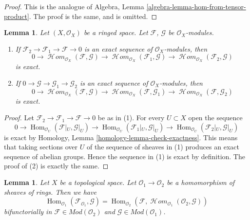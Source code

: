 \documentclass{stacks-project}
\theoremstyle{plain}
\newtheorem{lemma}[subsection]{Lemma}
\theoremstyle{definition}
\theoremstyle{remark}
\numberwithin{equation}{subsection}
\def\Hom{\mathop{\mathrm{Hom}}\nolimits}
\def\SheafHom{\mathop{\mathcal{H}\!\mathit{om}}\nolimits}
\begin{document}
\begin{proof}
This is the analogue of
Algebra, Lemma \ref{algebra-lemma-hom-from-tensor-product}.
The proof is the same, and is omitted.
\end{proof}

\begin{lemma}
\label{lemma-internal-hom-exact}
Let $(X, \mathcal{O}_X)$ be a ringed space.
Let $\mathcal{F}$, $\mathcal{G}$ be $\mathcal{O}_X$-modules.
\begin{enumerate}
\item If $\mathcal{F}_2 \to \mathcal{F}_1 \to \mathcal{F} \to 0$
is an exact sequence of $\mathcal{O}_X$-modules, then
$$
0 \to
\SheafHom_{\mathcal{O}_X}(\mathcal{F}, \mathcal{G}) \to
\SheafHom_{\mathcal{O}_X}(\mathcal{F}_1, \mathcal{G}) \to
\SheafHom_{\mathcal{O}_X}(\mathcal{F}_2, \mathcal{G})
$$
is exact.
\item If $0 \to \mathcal{G} \to \mathcal{G}_1 \to \mathcal{G}_2$
is an exact sequence of $\mathcal{O}_X$-modules, then
$$
0 \to
\SheafHom_{\mathcal{O}_X}(\mathcal{F}, \mathcal{G}) \to
\SheafHom_{\mathcal{O}_X}(\mathcal{F}, \mathcal{G}_1) \to
\SheafHom_{\mathcal{O}_X}(\mathcal{F}, \mathcal{G}_2)
$$
is exact.
\end{enumerate}
\end{lemma}

\begin{proof}
Let $\mathcal{F}_2 \to \mathcal{F}_1 \to \mathcal{F} \to 0$
be as in (1). For every $U \subset X$ open the sequence
$$
0 \to \Hom_{\mathcal{O}_U}(\mathcal{F}|_U, \mathcal{G}|_U) \to
\Hom_{\mathcal{O}_U}(\mathcal{F}_1|_U, \mathcal{G}|_U) \to
\Hom_{\mathcal{O}_U}(\mathcal{F}_2|_U, \mathcal{G}|_U)
$$
is exact by Homology, Lemma \ref{homology-lemma-check-exactness}.
This means that
taking sections over $U$ of the sequence of sheaves in (1) produces
an exact sequence of abelian groups. Hence the sequence in (1) is exact
by definition. The proof of (2) is exactly the same.
\end{proof}

\begin{lemma}
\label{lemma-adjoint-tensor-restrict}
Let $X$ be a topological space. Let $\mathcal{O}_1 \to \mathcal{O}_2$
be a homomorphism of sheaves of rings. Then we have
$$
\Hom_{\mathcal{O}_1}(\mathcal{F}_{\mathcal{O}_1}, \mathcal{G}) =
\Hom_{\mathcal{O}_2}(\mathcal{F},
\SheafHom_{\mathcal{O}_1}(\mathcal{O}_2, \mathcal{G}))
$$
bifunctorially in $\mathcal{F} \in \textit{Mod}(\mathcal{O}_2)$
and $\mathcal{G} \in \textit{Mod}(\mathcal{O}_1)$.
\end{lemma}
\end{document}
